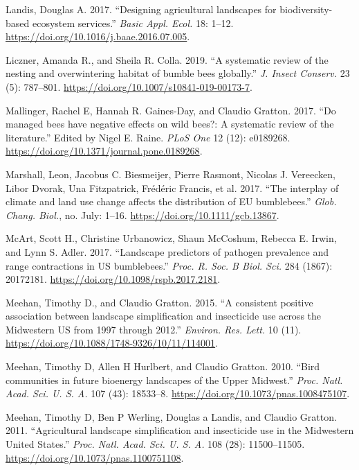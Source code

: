 \documentclass[11pt,]{article}
\begin{document}
\leavevmode\hypertarget{ref-Landis2017}{}%
Landis, Douglas A. 2017. ``Designing agricultural landscapes for
biodiversity-based ecosystem services.'' \emph{Basic Appl. Ecol.} 18:
1--12. \url{https://doi.org/10.1016/j.baae.2016.07.005}.

\leavevmode\hypertarget{ref-Liczner2019}{}%
Liczner, Amanda R., and Sheila R. Colla. 2019. ``A systematic review of
the nesting and overwintering habitat of bumble bees globally.''
\emph{J. Insect Conserv.} 23 (5): 787--801.
\url{https://doi.org/10.1007/s10841-019-00173-7}.

\leavevmode\hypertarget{ref-Mallinger2017a}{}%
Mallinger, Rachel E, Hannah R. Gaines-Day, and Claudio Gratton. 2017.
``Do managed bees have negative effects on wild bees?: A systematic
review of the literature.'' Edited by Nigel E. Raine. \emph{PLoS One} 12
(12): e0189268. \url{https://doi.org/10.1371/journal.pone.0189268}.

\leavevmode\hypertarget{ref-Marshall2017}{}%
Marshall, Leon, Jacobus C. Biesmeijer, Pierre Rasmont, Nicolas J.
Vereecken, Libor Dvorak, Una Fitzpatrick, Frédéric Francis, et al. 2017.
``The interplay of climate and land use change affects the distribution
of EU bumblebees.'' \emph{Glob. Chang. Biol.}, no. July: 1--16.
\url{https://doi.org/10.1111/gcb.13867}.

\leavevmode\hypertarget{ref-McArt2017}{}%
McArt, Scott H., Christine Urbanowicz, Shaun McCoshum, Rebecca E. Irwin,
and Lynn S. Adler. 2017. ``Landscape predictors of pathogen prevalence
and range contractions in US bumblebees.'' \emph{Proc. R. Soc. B Biol.
Sci.} 284 (1867): 20172181.
\url{https://doi.org/10.1098/rspb.2017.2181}.

\leavevmode\hypertarget{ref-Meehan2015}{}%
Meehan, Timothy D., and Claudio Gratton. 2015. ``A consistent positive
association between landscape simplification and insecticide use across
the Midwestern US from 1997 through 2012.'' \emph{Environ. Res. Lett.}
10 (11). \url{https://doi.org/10.1088/1748-9326/10/11/114001}.

\leavevmode\hypertarget{ref-Meehan2010a}{}%
Meehan, Timothy D, Allen H Hurlbert, and Claudio Gratton. 2010. ``Bird
communities in future bioenergy landscapes of the Upper Midwest.''
\emph{Proc. Natl. Acad. Sci. U. S. A.} 107 (43): 18533--8.
\url{https://doi.org/10.1073/pnas.1008475107}.

\leavevmode\hypertarget{ref-Meehan2011}{}%
Meehan, Timothy D, Ben P Werling, Douglas a Landis, and Claudio Gratton.
2011. ``Agricultural landscape simplification and insecticide use in the
Midwestern United States.'' \emph{Proc. Natl. Acad. Sci. U. S. A.} 108
(28): 11500--11505. \url{https://doi.org/10.1073/pnas.1100751108}.
\end{document}
